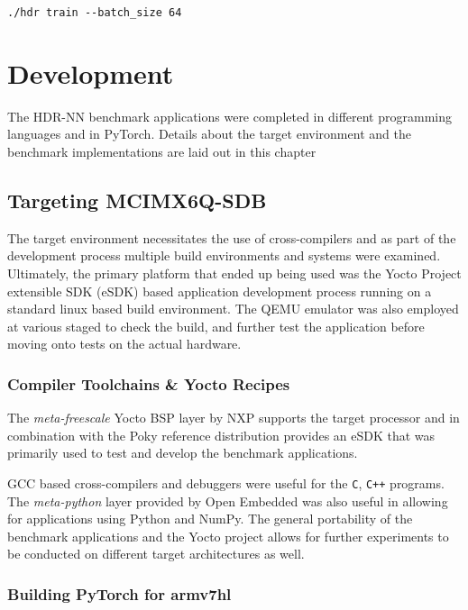 \begin{verbatim}
./hdr train --batch_size 64
\end{verbatim}



\chapter{Development}

The HDR-NN benchmark applications were completed in different programming languages and in PyTorch. Details about the target environment and the benchmark implementations are laid out in this chapter

\section{Targeting MCIMX6Q-SDB}

The target environment necessitates the use of cross-compilers and as part of the development process multiple build environments and systems were examined. Ultimately, the primary platform that ended up being used was the Yocto Project extensible SDK (eSDK) based application development process running on a standard linux based build environment. The QEMU emulator was also employed at various staged to check the build, and further test the application before moving onto tests on the actual hardware.

\subsection{Compiler Toolchains \& Yocto Recipes}

The \textit{meta-freescale} Yocto BSP layer by NXP supports the target processor and in combination with the Poky reference distribution provides an eSDK that was primarily used to test and develop the benchmark applications.

GCC based cross-compilers and debuggers were useful for the \texttt{C}, \texttt{C++}  programs. The \textit{meta-python} layer provided by Open Embedded was also useful in allowing for applications using Python and NumPy. The general portability of the benchmark applications and the Yocto project allows for further experiments to be conducted on different target architectures as well.

\subsection{Building PyTorch for armv7hl}

